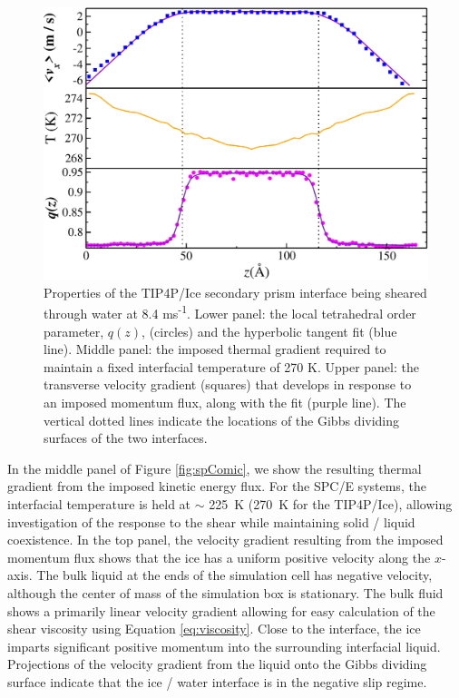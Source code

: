 \begin{figure}
\includegraphics[width=\linewidth]{Figures/SecPrism_TIP4PIce_Plot}
\caption{\label{fig:tipsComic} Properties of the TIP4P/Ice secondary prism
  interface being sheared through water at 8.4
  ms\textsuperscript{-1}. Lower panel: the local tetrahedral order
  parameter, $q(z)$, (circles) and the hyperbolic tangent fit
  (blue line).  Middle panel: the imposed thermal gradient
  required to maintain a fixed interfacial temperature of 270 K. Upper
  panel: the transverse velocity gradient (squares) that develops in
  response to an imposed momentum flux, along with the fit (purple
  line). The vertical dotted lines indicate the locations of the Gibbs
  dividing surfaces of the two interfaces.}
\end{figure}

In the middle panel of Figure \ref{fig:spComic}, we show the resulting
thermal gradient from the imposed kinetic energy flux. For the SPC/E
systems, the interfacial temperature is held at $\sim$ 225~K
(270~K for the TIP4P/Ice), allowing investigation of the response to
the shear while maintaining solid / liquid coexistence. In the top
panel, the velocity gradient resulting from the imposed momentum flux
shows that the ice has a uniform positive velocity along the
$x$-axis. The bulk liquid at the ends of the simulation cell has
negative velocity, although the center of mass of the simulation box
is stationary.  The bulk fluid shows a primarily linear velocity
gradient allowing for easy calculation of the shear viscosity using
Equation \eqref{eq:viscosity}. Close to the interface, the ice imparts
significant positive momentum into the surrounding interfacial liquid.
Projections of the velocity gradient from the liquid onto the Gibbs
dividing surface indicate that the ice / water interface is in the
negative slip regime. 

